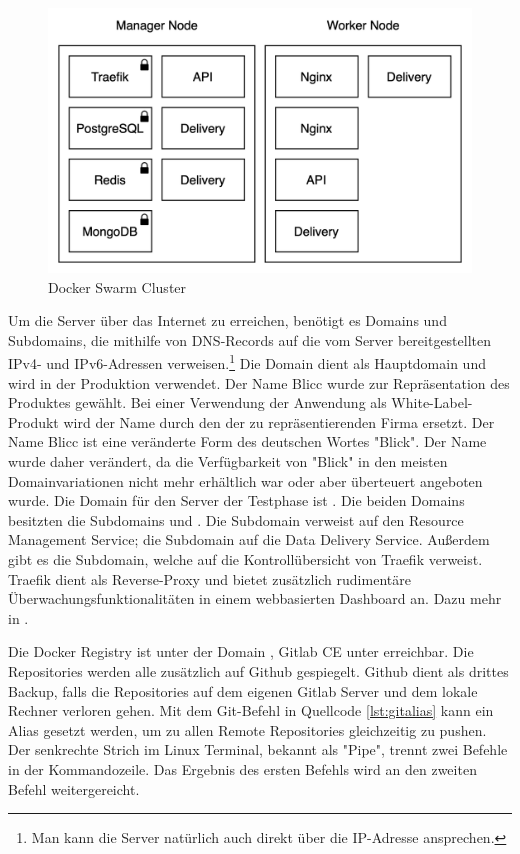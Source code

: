 \begin{figure}
    \begin{center}
    \includegraphics[scale=0.2]{img/abbildungen/Cluster}
    \end{center}
    \caption{Docker Swarm Cluster}
    \label{figure:dockerswarmcluster}
\end{figure}


Um die Server über das Internet zu erreichen, benötigt es Domains
und Subdomains, die mithilfe von DNS-Records auf die vom Server bereitgestellten
IPv4- und IPv6-Adressen verweisen.\footnote{Man kann die Server natürlich auch direkt über
die IP-Adresse ansprechen.} Die Domain  dient als
Hauptdomain und wird in der Produktion verwendet. Der Name Blicc
wurde zur Repräsentation des Produktes gewählt. Bei einer Verwendung der Anwendung
als White-Label-Produkt wird der Name durch den der zu repräsentierenden Firma ersetzt.
Der Name Blicc ist eine veränderte Form des deutschen Wortes "Blick". Der Name wurde
daher verändert, da die Verfügbarkeit von "Blick" in den meisten Domainvariationen
nicht mehr erhältlich war oder aber überteuert angeboten wurde. Die Domain für den
Server der Testphase ist . Die beiden Domains besitzten die
Subdomains  und . Die Subdomain  verweist auf
den Resource Management Service; die Subdomain  auf die Data Delivery Service.
Außerdem gibt es die  Subdomain, welche auf die Kontrollübersicht von Traefik
verweist. Traefik dient als Reverse-Proxy und bietet zusätzlich rudimentäre
Überwachungsfunktionalitäten in einem webbasierten Dashboard an.
Dazu mehr in .

Die Docker Registry ist unter der Domain , Gitlab CE
unter  erreichbar. Die Repositories werden alle zusätzlich
auf Github gespiegelt. Github dient als drittes Backup, falls die Repositories auf dem
eigenen Gitlab Server und dem lokale Rechner verloren gehen. Mit dem Git-Befehl in
Quellcode \ref{lst:gitalias} kann ein Alias gesetzt werden, um zu allen Remote Repositories
gleichzeitig zu pushen. Der senkrechte Strich im Linux Terminal, bekannt als "Pipe",
trennt zwei Befehle in der Kommandozeile. Das Ergebnis des ersten Befehls wird
an den zweiten Befehl weitergereicht.


